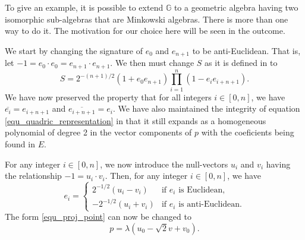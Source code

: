 \documentclass{birkjour}
\theoremstyle{definition}
\theoremstyle{remark}
\numberwithin{equation}{section}
\newcommand{\G}{\mathbb{G}}
\begin{document}
To give an example, it is possible to extend $\G$ to a geometric algebra having
two isomorphic sub-algebras that are Minkowski algebras.  There is more than one way
to do it.  The motivation for our choice here will be seen in the outcome.

We start by changing the signature of $e_0$ and $e_{n+1}$ to be anti-Euclidean.
That is, let $-1=e_0\cdot e_0=e_{n+1}\cdot e_{n+1}$.  We then must change
$S$ as it is defined in \cite{Parkin12} to
\begin{equation}
S=2^{-(n+1)/2}(1+e_0e_{n+1})\prod_{i=1}^n(1-e_ie_{i+n+1}).
\end{equation}
We have now preserved the property that for all integers $i\in[0,n]$, we have $\overline{e_i}=e_{i+n+1}$
and $\overline{e_{i+n+1}}=e_i$.  We have also maintained the integrity of equation \eqref{equ_quadric_representation}
in that it still expands as a homogeneous polynomial of degree 2 in the vector components of $p$ with the coeficients
being found in $E$.

For any integer $i\in[0,n]$, we now introduce the null-vectors $u_i$ and $v_i$ having
the relationship $-1=u_i\cdot v_i$.  Then, for any integer $i\in[0,n]$, we have
\begin{equation}
e_i = \left\{\begin{array}{ll}
2^{-1/2}(u_i-v_i) & \mbox{if $e_i$ is Euclidean,} \\
-2^{-1/2}(u_i+v_i) & \mbox{if $e_i$ is anti-Euclidean.}
\end{array}\right.
\end{equation}
The form \eqref{equ_proj_point} can now be changed to
\begin{equation}
p = \lambda(u_0 - \sqrt{2}v + v_0).
\end{equation}


%



\end{document}
